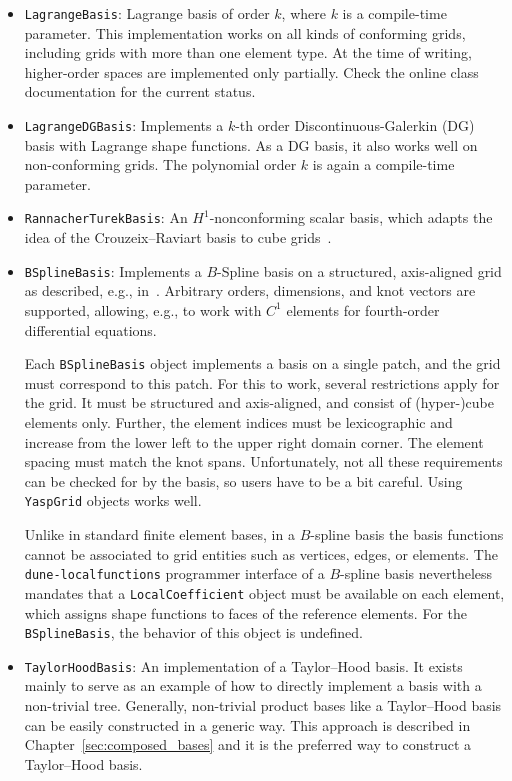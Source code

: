 \documentclass[a4paper,10pt,headings=normal,bibliography=totoc]{scrartcl}
\newcommand{\cpp}[1]{\lstinline[basicstyle=\ttfamily]!#1!}
\newcommand{\dunemodule}[1]{\texttt{#1}}
\begin{document}
\begin{itemize}
 \item \cpp{LagrangeBasis}: Lagrange basis of order $k$, where $k$ is a compile-time parameter.
   This implementation works on all kinds of conforming grids, including grids with more
   than one element type.  At the time of writing, higher-order spaces are implemented only partially.
   Check the online class documentation for the current status.

 \item \cpp{LagrangeDGBasis}: Implements a $k$-th order Discontinuous-Galerkin (DG) basis with Lagrange shape functions.
   As a DG basis, it also
   works well on non-conforming grids.  The polynomial order $k$ is again a compile-time parameter.

 \item \cpp{RannacherTurekBasis}: An $H^1$-nonconforming scalar basis, which adapts the idea
   of the Crouzeix--Raviart basis to cube grids~\cite{rannacher_turek:1992}.

 \item \cpp{BSplineBasis}:  Implements a $B$-Spline basis on a structured, axis-aligned grid as described,
   e.g., in~\cite{cottrell_hughes_bazilevs:2009}.  Arbitrary orders, dimensions, and knot vectors are supported,
   allowing, e.g., to work with $C^1$ elements for fourth-order differential equations.

   Each \cpp{BSplineBasis} object implements a basis on a single patch, and the grid must correspond to this
   patch. For this to work, several restrictions apply for the grid.  It must be structured and axis-aligned,
   and consist of (hyper-)cube elements only.  Further, the element indices must be lexicographic and
   increase from the lower left to the upper right domain corner.  The element spacing must match the knot spans.
   Unfortunately, not all these requirements can be checked for by the basis, so users have to be a bit
   careful.  Using \cpp{YaspGrid} objects works well.

   Unlike in standard finite element bases, in a $B$-spline basis the basis functions cannot be associated
   to grid entities such as vertices, edges, or elements.  The \dunemodule{dune-localfunctions}
   programmer interface of a $B$-spline basis nevertheless mandates that a
   \cpp{LocalCoefficient} object must be available on each element, which assigns shape functions
   to faces of the reference elements. For the \cpp{BSplineBasis}, the behavior of this
   object is undefined.

 \item \cpp{TaylorHoodBasis}:
   An implementation of a Taylor--Hood basis.  It exists mainly to serve as an example of
   how to directly implement a basis with a non-trivial tree.
   Generally, non-trivial product bases like a Taylor--Hood basis
   can be easily constructed in a generic way. This approach is described
   in Chapter~\ref{sec:composed_bases} and it is the preferred way to construct
   a Taylor--Hood basis.
\end{itemize}
\end{document}
